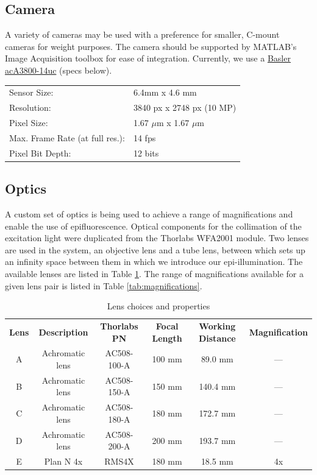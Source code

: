 \documentclass{article}
\begin{document}
\subsection{Camera}
	
A variety of cameras may be used with a preference for smaller, C-mount cameras for weight purposes.
The camera should be supported by MATLAB's Image Acquisition toolbox for ease of integration.
Currently, we use a \href{https://www.baslerweb.com/en/products/cameras/area-scan-cameras/ace/aca3800-14uc/}{Basler acA3800-14uc} (specs below).

\begin{tabular}{l l}
    Sensor Size: & 6.4mm x 4.6 mm \\
    Resolution: & 3840 px x 2748 px (10 MP) \\
    Pixel Size: & 1.67 $\mu$m x 1.67 $\mu$m \\
    Max. Frame Rate (at full res.): & 14 fps \\
    Pixel Bit Depth: & 12 bits
\end{tabular}

\subsection{Optics}
A custom set of optics is being used to achieve a range of magnifications and enable the use of epifluorescence.
Optical components for the collimation of the excitation light were duplicated from the Thorlabs WFA2001 module.
Two lenses are used in the system, an objective lens and a tube lens, between which sets up an infinity space between them in which we introduce our epi-illumination.
The available lenses are listed in Table \ref{tab:lenses}.
The range of magnifications available for a given lens pair is listed in Table \ref{tab:magnifications}.

\begin{table}[!h]
\centering
\begin{tabular}{c c c c c c}
    \textbf{Lens}  & \textbf{Description} & \textbf{Thorlabs PN} & \textbf{Focal Length} & \textbf{Working Distance} & \textbf{Magnification} \\
    A & Achromatic lens & AC508-100-A & 100 mm & 89.0 mm & --- \\
	B & Achromatic lens & AC508-150-A & 150 mm & 140.4 mm & --- \\
	C & Achromatic lens & AC508-180-A & 180 mm & 172.7 mm & --- \\
	D & Achromatic lens & AC508-200-A & 200 mm & 193.7 mm & --- \\
	E & Plan N 4x & RMS4X & 180 mm & 18.5 mm & 4x 
\end{tabular}
\caption{Lens choices and properties}
\label{tab:lenses}
\end{table}
\end{document}
